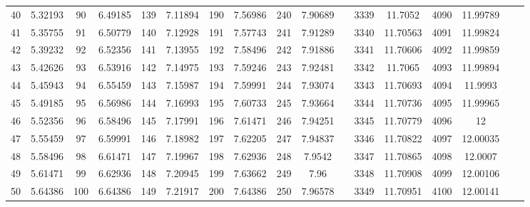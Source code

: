 {\begin{tabular}[h]{|cc|cc|cc|cc|cc|c|cc|cc|cc|}
40&5.32193&90&6.49185&139&7.11894&190&7.56986&240&7.90689& &3339&11.7052&4090&11.99789\\ 
41&5.35755&91&6.50779&140&7.12928&191&7.57743&241&7.91289& &3340&11.70563&4091&11.99824\\ 
42&5.39232&92&6.52356&141&7.13955&192&7.58496&242&7.91886& &3341&11.70606&4092&11.99859\\ 
43&5.42626&93&6.53916&142&7.14975&193&7.59246&243&7.92481& &3342&11.7065&4093&11.99894\\ 
44&5.45943&94&6.55459&143&7.15987&194&7.59991&244&7.93074& &3343&11.70693&4094&11.9993\\ 
45&5.49185&95&6.56986&144&7.16993&195&7.60733&245&7.93664& &3344&11.70736&4095&11.99965\\ 
46&5.52356&96&6.58496&145&7.17991&196&7.61471&246&7.94251& &3345&11.70779&4096&12\\ 
47&5.55459&97&6.59991&146&7.18982&197&7.62205&247&7.94837& &3346&11.70822&4097&12.00035\\ 
48&5.58496&98&6.61471&147&7.19967&198&7.62936&248&7.9542& &3347&11.70865&4098&12.0007\\ 
49&5.61471&99&6.62936&148&7.20945&199&7.63662&249&7.96& &3348&11.70908&4099&12.00106\\ 
50&5.64386&100&6.64386&149&7.21917&200&7.64386&250&7.96578& &3349&11.70951&4100&12.00141\\ \hline
\end{tabular}
}
